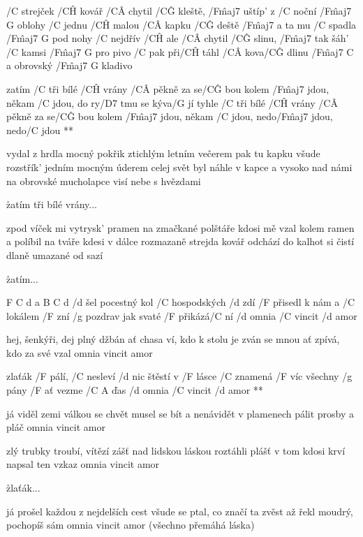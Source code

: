 
/C strejček /C\^H kovář /C\^A chytil /C\^G kleště, /F\^{maj7} uštíp' z /C noční /{F\^{maj7} G} oblohy
/C jednu /C\^H malou /C\^A kapku /C\^G deště /F\^{maj7} a ta mu /C spadla /{F\^{maj7} G} pod nohy
/C nejdřív /C\^H ale /C\^A chytil /C\^G slinu, /F\^{maj7} tak šáh' /C kamsi /{F\^{maj7} G} pro pivo
/C pak při/C\^H táhl /C\^A kova/C\^G dlinu /{F\^{maj7} C} a obrovský /{F\^{maj7} G} kladivo

\R  zatím /C tři bílé /C\^H vrány /C\^A pěkně za se/C\^G bou
    kolem /F\^{maj7} jdou, někam /C jdou, do ry/D7 tmu se kýva/G jí
    tyhle /C tři bílé /C\^H vrány /C\^A pěkně za se/C\^G bou
    kolem /F\^{maj7} jdou, někam /C jdou, nedo/F\^{maj7} jdou, nedo/C jdou **

vydal z hrdla mocný pokřik ztichlým letním večerem
pak tu kapku všude rozstřík' jedním mocným úderem
celej svět byl náhle v kapce a vysoko nad námi
na obrovské mucholapce visí nebe s hvězdami

\r zatím tři bílé vrány...

zpod víček mi vytrysk' pramen na zmačkané polštáře
kdosi mě vzal kolem ramen a políbil na tváře
kdesi v dálce rozmazaně strejda kovář odchází
do kalhot si čistí dlaně umazané od sazí

\r zatím...




F C d a B C d
/d šel pocestný kol /C hospodských /d zdí
/F přisedl k nám a /C lokálem /F zní
/g pozdrav jak svaté /F přikázá/C ní
/d omnia /C vincit /d amor \s

hej, šenkýři, dej plný džbán
ať chasa ví, kdo k stolu je zván
se mnou ať zpívá, kdo za své vzal
omnia vincit amor \s

\R zlaťák /F pálí, /C nesleví /d nic
   štěstí v /F lásce /C znamená /F víc
   všechny /g pány /F ať vezme /{C A} ďas
   /d omnia /C vincit /d amor **

já viděl zemi válkou se chvět
musel se bít a nenávidět
v plamenech pálit prosby a pláč
omnia vincit amor \s

zlý trubky troubí, vítězí zášť
nad lidskou láskou roztáhli plášť
v tom kdosi krví napsal ten vzkaz
omnia vincit amor \s

\r zlaťák...

já prošel každou z nejdelších cest
všude se ptal, co značí ta zvěst
až řekl moudrý, pochopíš sám
omnia vincit amor (všechno přemáhá láska) \s

